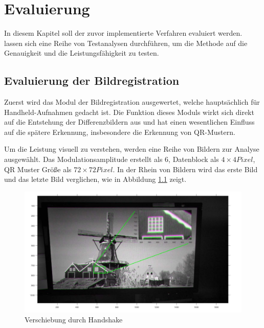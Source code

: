\chapter{Evaluierung} \label{cha:Evaluierung}

In diesem Kapitel soll der zuvor implementierte Verfahren evaluiert werden.  lassen sich eine Reihe von Testanalysen durchführen, um die Methode auf die Genauigkeit und die Leistungsfähigkeit zu testen.


\section{Evaluierung der Bildregistration}

Zuerst wird das Modul der Bildregistration ausgewertet, welche  hauptsächlich für Handheld-Aufnahmen gedacht ist. Die Funktion dieses Moduls wirkt sich direkt auf die Entstehung der Differenzbildern aus und hat einen wesentlichen Einfluss auf die spätere Erkennung, insbesondere die Erkennung von QR-Mustern. 

Um die Leistung visuell zu verstehen, werden  eine Reihe von Bildern zur Analyse ausgewählt. Das Modulationsamplitude erstellt als 6, Datenblock als $ 4 \times 4 Pixel$, QR Muster Größe als $ 72 \times 72 Pixel $.  In der Rhein von Bildern wird das erste Bild und das letzte Bild verglichen, wie in Abbildung \ref{fig:vorregistration} zeigt. 



\begin{figure}[H]
 \centering 
  \includegraphics[keepaspectratio,width=1.0\textwidth]{images/5_Implementirung/vorregistration.pdf}
 \caption{Verschiebung durch Handshake}
 \label{fig:vorregistration}
\end{figure}

